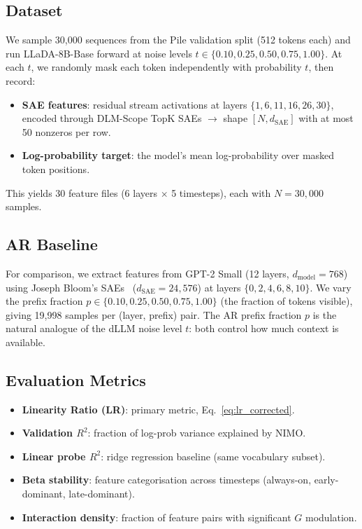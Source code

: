 \documentclass[11pt]{article}
\begin{document}
\subsection{Dataset}

We sample 30,000 sequences from the Pile validation split (512 tokens each) and run LLaDA-8B-Base forward at noise levels $t \in \{0.10, 0.25, 0.50, 0.75, 1.00\}$.
At each $t$, we randomly mask each token independently with probability $t$, then record:
\begin{itemize}
    \item \textbf{SAE features}: residual stream activations at layers $\{1, 6, 11, 16, 26, 30\}$, encoded through DLM-Scope TopK SAEs $\to$ shape $[N, d_\mathrm{SAE}]$ with at most 50 nonzeros per row.
    \item \textbf{Log-probability target}: the model's mean log-probability over masked token positions.
\end{itemize}
This yields 30 feature files (6 layers $\times$ 5 timesteps), each with $N = 30{,}000$ samples.

\subsection{AR Baseline}

For comparison, we extract features from GPT-2 Small (12 layers, $d_\mathrm{model} = 768$) using Joseph Bloom's SAEs~\citep{bloom2024sae} ($d_\mathrm{SAE} = 24{,}576$) at layers $\{0, 2, 4, 6, 8, 10\}$.
We vary the prefix fraction $p \in \{0.10, 0.25, 0.50, 0.75, 1.00\}$ (the fraction of tokens visible), giving 19,998 samples per (layer, prefix) pair.
The AR prefix fraction $p$ is the natural analogue of the dLLM noise level $t$: both control how much context is available.

\subsection{Evaluation Metrics}

\begin{itemize}
    \item \textbf{Linearity Ratio (LR)}: primary metric, Eq.~\eqref{eq:lr_corrected}.
    \item \textbf{Validation $R^2$}: fraction of log-prob variance explained by NIMO.
    \item \textbf{Linear probe $R^2$}: ridge regression baseline (same vocabulary subset).
    \item \textbf{Beta stability}: feature categorisation across timesteps (always-on, early-dominant, late-dominant).
    \item \textbf{Interaction density}: fraction of feature pairs with significant $G$ modulation.
\end{itemize}
\end{document}
